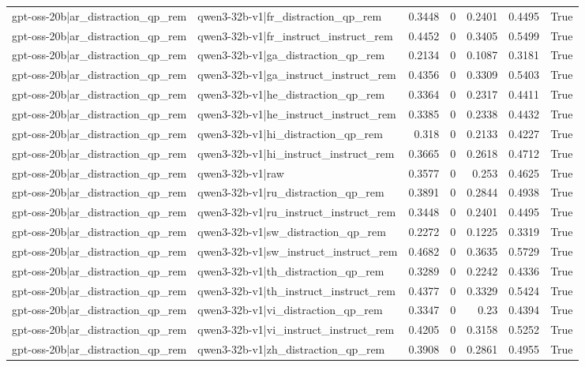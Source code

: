 \begin{table}
\begin{tabular}{l l r r r r l}
gpt-oss-20b|ar_distraction_qp_rem & qwen3-32b-v1|fr_distraction_qp_rem & 0.3448 & 0 & 0.2401 & 0.4495 & True \\
gpt-oss-20b|ar_distraction_qp_rem & qwen3-32b-v1|fr_instruct_instruct_rem & 0.4452 & 0 & 0.3405 & 0.5499 & True \\
gpt-oss-20b|ar_distraction_qp_rem & qwen3-32b-v1|ga_distraction_qp_rem & 0.2134 & 0 & 0.1087 & 0.3181 & True \\
gpt-oss-20b|ar_distraction_qp_rem & qwen3-32b-v1|ga_instruct_instruct_rem & 0.4356 & 0 & 0.3309 & 0.5403 & True \\
gpt-oss-20b|ar_distraction_qp_rem & qwen3-32b-v1|he_distraction_qp_rem & 0.3364 & 0 & 0.2317 & 0.4411 & True \\
gpt-oss-20b|ar_distraction_qp_rem & qwen3-32b-v1|he_instruct_instruct_rem & 0.3385 & 0 & 0.2338 & 0.4432 & True \\
gpt-oss-20b|ar_distraction_qp_rem & qwen3-32b-v1|hi_distraction_qp_rem & 0.318 & 0 & 0.2133 & 0.4227 & True \\
gpt-oss-20b|ar_distraction_qp_rem & qwen3-32b-v1|hi_instruct_instruct_rem & 0.3665 & 0 & 0.2618 & 0.4712 & True \\
gpt-oss-20b|ar_distraction_qp_rem & qwen3-32b-v1|raw & 0.3577 & 0 & 0.253 & 0.4625 & True \\
gpt-oss-20b|ar_distraction_qp_rem & qwen3-32b-v1|ru_distraction_qp_rem & 0.3891 & 0 & 0.2844 & 0.4938 & True \\
gpt-oss-20b|ar_distraction_qp_rem & qwen3-32b-v1|ru_instruct_instruct_rem & 0.3448 & 0 & 0.2401 & 0.4495 & True \\
gpt-oss-20b|ar_distraction_qp_rem & qwen3-32b-v1|sw_distraction_qp_rem & 0.2272 & 0 & 0.1225 & 0.3319 & True \\
gpt-oss-20b|ar_distraction_qp_rem & qwen3-32b-v1|sw_instruct_instruct_rem & 0.4682 & 0 & 0.3635 & 0.5729 & True \\
gpt-oss-20b|ar_distraction_qp_rem & qwen3-32b-v1|th_distraction_qp_rem & 0.3289 & 0 & 0.2242 & 0.4336 & True \\
gpt-oss-20b|ar_distraction_qp_rem & qwen3-32b-v1|th_instruct_instruct_rem & 0.4377 & 0 & 0.3329 & 0.5424 & True \\
gpt-oss-20b|ar_distraction_qp_rem & qwen3-32b-v1|vi_distraction_qp_rem & 0.3347 & 0 & 0.23 & 0.4394 & True \\
gpt-oss-20b|ar_distraction_qp_rem & qwen3-32b-v1|vi_instruct_instruct_rem & 0.4205 & 0 & 0.3158 & 0.5252 & True \\
gpt-oss-20b|ar_distraction_qp_rem & qwen3-32b-v1|zh_distraction_qp_rem & 0.3908 & 0 & 0.2861 & 0.4955 & True \\

\end{tabular}
\end{table}
